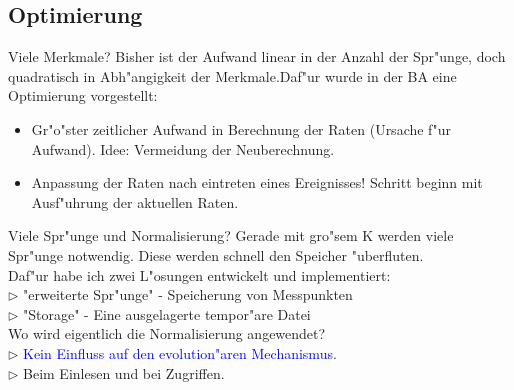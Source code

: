 \documentclass{beamer}
\begin{document}
\subsection{Optimierung}
\begin{frame}{Viele Merkmale?}
Bisher ist der Aufwand linear in der Anzahl der Spr"unge, doch quadratisch in Abh"angigkeit der Merkmale.\pause Daf"ur wurde in der BA eine Optimierung vorgestellt:
	\begin{itemize}
		\item Gr"o"ster zeitlicher Aufwand in Berechnung der Raten (Ursache f"ur Aufwand). Idee: Vermeidung der Neuberechnung.\pause
		\item Anpassung der Raten nach eintreten eines Ereignisses! Schritt beginn mit Ausf"uhrung der aktuellen Raten.
	\end{itemize}
\end{frame}

\begin{frame}{Viele Spr"unge und Normalisierung?}
Gerade mit gro"sem K werden viele Spr"unge notwendig. Diese werden schnell den Speicher "uberfluten.\pause\bigskip\\
Daf"ur habe ich zwei L"osungen entwickelt und implementiert:\\
$ \rhd $ "{}erweiterte Spr"unge"{} - Speicherung von Messpunkten\\
$ \rhd $ "{}Storage"{} - Eine ausgelagerte tempor"are Datei\bigskip\\\pause
Wo wird eigentlich die Normalisierung angewendet?\\\pause
$ \rhd $ \textcolor{blue}{Kein Einfluss auf den evolution"aren Mechanismus}.\\
$ \rhd $ Beim Einlesen und bei Zugriffen.\\
\end{frame}
\end{document}

